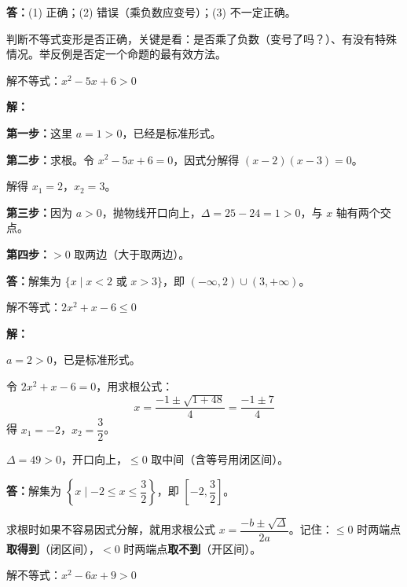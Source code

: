 \documentclass[12pt, a4paper]{ctexart}
\begin{document}
\textbf{答：}(1) 正确；(2) 错误（乘负数应变号）；(3) 不一定正确。

\begin{tipbox}[方法总结]
判断不等式变形是否正确，关键是看：是否乘了负数（变号了吗？）、有没有特殊情况。举反例是否定一个命题的最有效方法。
\end{tipbox}

\begin{examplebox}
解不等式：$x^2 - 5x + 6 > 0$
\end{examplebox}

\textbf{解：}

\textbf{第一步：}这里 $a = 1 > 0$，已经是标准形式。

\textbf{第二步：}求根。令 $x^2 - 5x + 6 = 0$，因式分解得 $(x-2)(x-3) = 0$。

解得 $x_1 = 2$，$x_2 = 3$。

\textbf{第三步：}因为 $a > 0$，抛物线开口向上，$\Delta = 25 - 24 = 1 > 0$，与 $x$ 轴有两个交点。

\textbf{第四步：}$> 0$ 取两边（大于取两边）。

\textbf{答：}解集为 $\{x \mid x < 2 \text{ 或 } x > 3\}$，即 $(-\infty, 2) \cup (3, +\infty)$。

\begin{examplebox}
解不等式：$2x^2 + x - 6 \leq 0$
\end{examplebox}

\textbf{解：}

$a = 2 > 0$，已是标准形式。

令 $2x^2 + x - 6 = 0$，用求根公式：
\[
x = \frac{-1 \pm \sqrt{1 + 48}}{4} = \frac{-1 \pm 7}{4}
\]
得 $x_1 = -2$，$x_2 = \dfrac{3}{2}$。

$\Delta = 49 > 0$，开口向上，$\leq 0$ 取中间（含等号用闭区间）。

\textbf{答：}解集为 $\left\{x \mid -2 \leq x \leq \dfrac{3}{2}\right\}$，即 $\left[-2, \dfrac{3}{2}\right]$。

\begin{tipbox}[方法总结]
求根时如果不容易因式分解，就用求根公式 $x = \dfrac{-b \pm \sqrt{\Delta}}{2a}$。记住：$\leq 0$ 时两端点\textbf{取得到}（闭区间），$< 0$ 时两端点\textbf{取不到}（开区间）。
\end{tipbox}

\begin{examplebox}[【例题4】一元二次不等式（$\Delta = 0$）]
解不等式：$x^2 - 6x + 9 > 0$
\end{examplebox}
\end{document}
